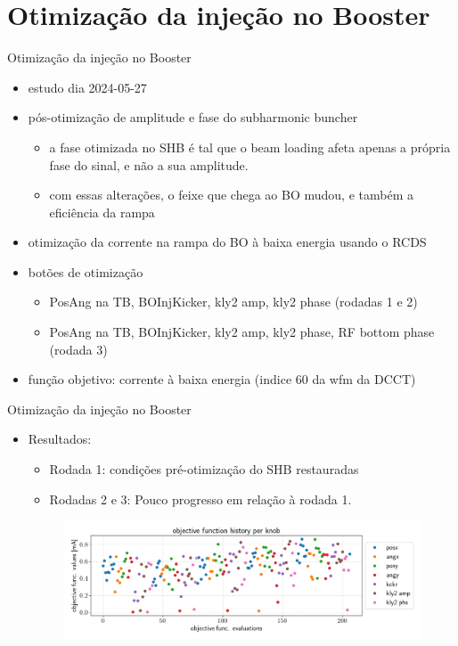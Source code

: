 \section{Otimização da injeção no Booster}



\begin{frame}{Otimização da injeção no Booster}
\begin{itemize}
    \item estudo dia 2024-05-27 \href{https://ais-eng-srv-ta.cnpem.br/Olog/index.html\#22587\_6}{}
    \item pós-otimização de amplitude e fase do subharmonic buncher 
    \begin{itemize}
        \item a fase otimizada no SHB é tal que o beam loading afeta apenas a própria fase do sinal, e não a sua amplitude.
        \item com essas alterações, o feixe que chega ao BO mudou, e também a eficiência da rampa
    \end{itemize}
    \item otimização da corrente na rampa do BO à baixa energia usando o RCDS
    \item botões de otimização
    \begin{itemize}
        \item PosAng na TB, BOInjKicker, kly2 amp, kly2 phase (rodadas 1 e 2)
        \item PosAng na TB, BOInjKicker, kly2 amp, kly2 phase, RF bottom phase (rodada 3)
    \end{itemize}
    \item função objetivo: corrente à baixa energia (indice 60 da wfm da DCCT) 
\end{itemize}    
\end{frame}


\begin{frame}{Otimização da injeção no Booster}
\begin{itemize}
\item Resultados: 
\begin{itemize}
    \item Rodada 1: condições pré-otimização do SHB restauradas 
    \item Rodadas 2 e 3: Pouco progresso em relação à rodada 1.
\end{itemize}
\begin{figure}
    \centering
    \includegraphics[width=\linewidth]{2024-07-12/figures/run1_history_by_knob.png}
\end{figure}
\end{itemize}
\end{frame}
